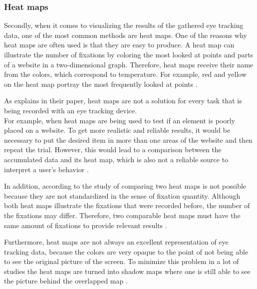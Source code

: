 \subsubsection{Heat maps}
Secondly, when it comes to visualizing the results of the gathered eye tracking data, one of the most common methods are heat maps. One of the reasons why heat maps are often used is that they are easy to produce. 
A heat map can illustrate the number of fixations by coloring the most looked at points and parts of a website in a two-dimensional graph. Therefore, heat maps receive their name from the colors, which correspond to temperature. For example, red and yellow on the heat map portray the most frequently looked at points \autocite[]{bojko2009informative}. 

As \textcite[]{bojko2009informative} explains in their paper, heat maps are not a solution for every task that is being recorded with an eye tracking device. \\
For example, when heat maps are being used to test if an element is poorly placed on a website. To get more realistic and reliable results, it would be necessary to put the desired item in more than one areas of the website and then repeat the trial. However, this would lead to a comparison between the accumulated data and its heat map, which is also not a reliable source to interpret a user's behavior \autocite[]{bojko2009informative}. 

In addition, according to the study of \textcite[]{djamasbi2010efficiency} comparing two heat maps is not possible because they are not standardized in the sense of fixation quantity. Although both heat maps illustrate the fixations that were recorded before, the number of the fixations may differ. Therefore, two comparable heat maps must have the same amount of fixations to provide relevant results \autocite[]{djamasbi2010efficiency}. 

Furthermore, heat maps are not always an excellent representation of eye tracking data, because the colors are very opaque to the point of not being able to see the original picture of the screen. To minimize this problem in a lot of studies the heat maps are turned into shadow maps where one is still able to see the picture behind the overlapped map \autocite[]{vspakov2007visualization}.

